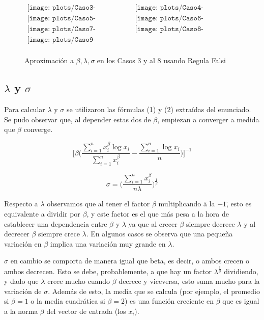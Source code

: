 \begin{figure}
$\begin{array}{cc}
\texttt{[image: plots/Caso3-RegulaFalsi.png]} &
\texttt{[image: plots/Caso4-RegulaFalsi.png]} \\
\texttt{[image: plots/Caso5-RegulaFalsi.png]} &
\texttt{[image: plots/Caso6-RegulaFalsi.png]} \\
\texttt{[image: plots/Caso7-RegulaFalsi.png]} &
\texttt{[image: plots/Caso8-RegulaFalsi.png]} \\
\texttt{[image: plots/Caso9-RegulaFalsi.png]} & \\

\end{array}$

\caption{Aproximaci\'on a $\beta, \lambda, \sigma$ en los Casos 3 y al 8 
usando Regula Falsi}
\label{fig:AproxCasosRegulaFalsi}


\end{figure}


\subsection{$\lambda$ y $\sigma$}

\indent Para calcular $\lambda$ y $\sigma$ se utilizaron las f\'ormulas 
(1) y (2) extra\'idas del enunciado. Se pudo observar que, al depender estas 
dos de $\beta$, empiezan a converger a medida que $\beta$ converge.

$$\big[ \beta \big( \frac{\sum_{i=1}^{n}x_i^\beta \log x_i}{ \sum_{i=1}^{n} x_i^\beta} 
- \frac{\sum_{i=1}^{n} \log x_i}{n} \big)\big]^{-1}$$

$$\sigma = \big( \frac{\sum_{i=1}^{n} x_i^\beta}{n\lambda}\big)^{\frac{1}{\beta}}$$

Respecto a $\lambda$ observamos que al tener el factor $\beta$ multiplicando 
\"a la $-1$\", esto es equivalente a dividir por $\beta$, y este factor es el 
que m\'as pesa a la hora de establecer una dependencia entre $\beta$ y $\lambda$ 
ya que al crecer $\beta$ siempre decrece $\lambda$ y al decrecer $\beta$ siempre
crece $\lambda$. En algunos casos se observa que una peque\~na variaci\'on en 
$\beta$ implica una variaci\'on muy grande en $\lambda$.

$\sigma$ en cambio se comporta de manera igual que beta, es decir, o ambos 
crecen o ambos decrecen. Esto se debe, probablemente, a que hay un factor 
$\lambda^{\frac{1}{\beta}}$ dividiendo, y dado que $\lambda$ crece mucho cuando 
$\beta$ decrece y viceversa, esto suma mucho para la variaci\'on de $\sigma$. 
Adem\'as de esto, la media que se calcula (por ejemplo, el promedio si $\beta = 
1$ o la media cuadr\'atica si $\beta = 2$) es una funci\'on creciente en 
$\beta$ que es igual a la norma $\beta$ del vector de entrada (los $x_i$).
